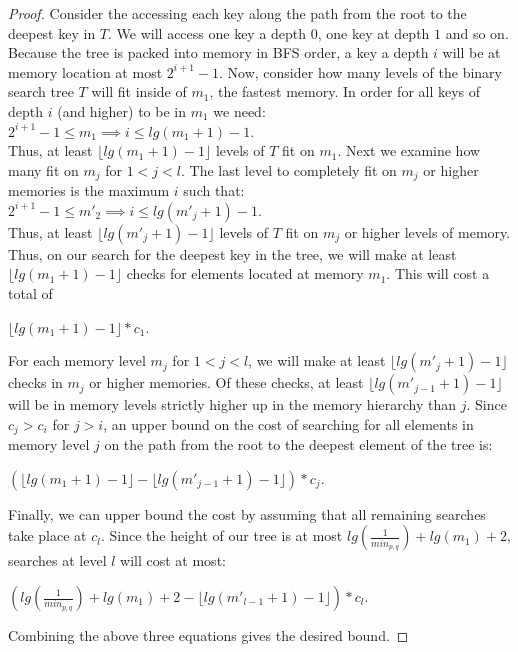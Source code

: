 \documentclass[letterpaper,12pt,titlepage,oneside,final]{book}
\theoremstyle{plain}
\begin{document}
\begin{proof}
Consider the accessing each key along the path from the root to the deepest key in $T$. We will access one key a depth $0$, one key at depth $1$ and so on. Because the tree is packed into memory in BFS order, a key a depth $i$ will be at memory location at most $2^{i+1}-1$. Now, consider how many levels of the binary search tree $T$ will fit inside of $m_1$, the fastest memory. In order for all keys of depth $i$ (and higher) to be in $m_1$ we need: \\
$2^{i+1}-1 \leq m_1 \implies i \leq lg(m_1 + 1) - 1$. \\
Thus, at least $\lfloor lg(m_1 + 1)-1 \rfloor$ levels of $T$ fit on $m_1$. Next we examine how many fit on $m_j$ for $1 < j < l$. The last level to completely fit on $m_j$ or higher memories is the maximum $i$ such that: \\
$2^{i+1}-1 \leq m'_2 \implies i \leq lg(m'_j + 1)-1$. \\
Thus, at least $\lfloor lg(m'_j + 1)-1 \rfloor$ levels of $T$ fit on $m_j$ or higher levels of memory. \\
Thus, on our search for the deepest key in the tree, we will make at least $\lfloor lg(m_1 + 1)-1 \rfloor$ checks for elements located at memory $m_1$. This will cost a total of\\
\begin{center}
$\lfloor lg(m_1 + 1)-1 \rfloor * c_1$.\\
\end{center}
For each memory level $m_j$ for $1 < j < l$, we will make at least $\lfloor lg(m'_j + 1)-1 \rfloor$ checks in $m_j$ or higher memories. Of these checks, at least $\lfloor lg(m'_{j-1} + 1)-1 \rfloor$ will be in memory levels strictly higher up in the memory hierarchy than $j$. Since $c_j > c_i$ for $j > i$, an upper bound on the cost of searching for all elements in memory level $j$ on the path from the root to the deepest element of the tree is: \\
\begin{center}
$(\lfloor lg(m_1 + 1)-1 \rfloor - \lfloor lg(m'_{j-1} + 1)-1 \rfloor) * c_j$.\\
\end{center}
Finally, we can upper bound the cost by assuming that all remaining searches take place at $c_l$. Since the height of our tree is at most $lg(\frac{1}{min_{p,q}}) + lg(m_1) + 2$, searches at level $l$ will cost at most: \\
\begin{center}
$(lg(\frac{1}{min_{p,q}}) + lg(m_1) + 2 - \lfloor lg(m'_{l-1}+1)-1 \rfloor)*c_l$. \\
\end{center}
Combining the above three equations gives the desired bound.

\end{proof}
\end{document}
